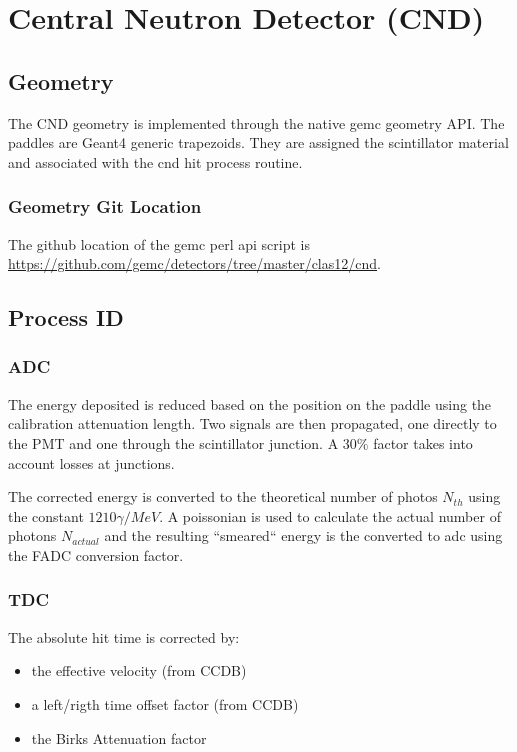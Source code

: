 \section{Central Neutron Detector (CND)}

\subsection{Geometry}

The CND geometry is implemented through the native gemc geometry API.
The paddles are Geant4 generic trapezoids. They are assigned the scintillator material and associated with the cnd hit process routine.

\subsubsection{Geometry Git Location}
The github location of the gemc perl api script is \url{https://github.com/gemc/detectors/tree/master/clas12/cnd}.


\subsection{Process ID}

\subsubsection{ADC}

The energy deposited is reduced based on the position on the paddle using the calibration attenuation length. Two signals are then propagated, one directly
to the PMT and one through the scintillator junction. A $30\%$ factor takes into account losses at junctions.

The corrected energy is converted to the theoretical number of photos $N_{th}$ using the constant $1210 \gamma / MeV $. A poissonian is used to
calculate the actual number of photons $N_{actual}$ and the resulting ``smeared`` energy is the converted to adc using the FADC conversion factor.

\subsubsection{TDC}

The absolute hit time is corrected by:

\begin{itemize}
	\item the effective velocity (from CCDB)
	\item a left/rigth time offset factor (from CCDB)
	\item the Birks Attenuation factor
\end{itemize}

